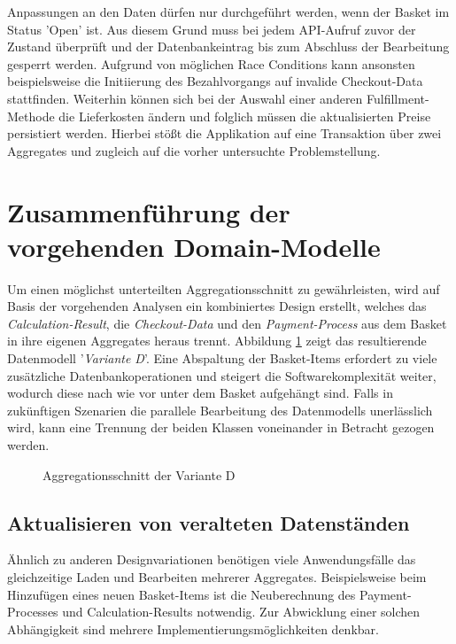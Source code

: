 Anpassungen an den Daten dürfen nur durchgeführt werden, wenn der Basket im Status 'Open' ist. Aus diesem Grund muss bei jedem API-Aufruf zuvor der Zustand überprüft und der Datenbankeintrag bis zum Abschluss der Bearbeitung gesperrt werden. Aufgrund von möglichen Race Conditions kann ansonsten beispielsweise die Initiierung des Bezahlvorgangs auf invalide Checkout-Data stattfinden. Weiterhin können sich bei der Auswahl einer anderen Fulfillment-Methode die Lieferkosten ändern und folglich müssen die aktualisierten Preise persistiert werden. Hierbei stößt die Applikation auf eine Transaktion über zwei Aggregates und zugleich auf die vorher untersuchte Problemstellung.

\pagebreak

\section{Zusammenführung der vorgehenden Domain-Modelle}

Um einen möglichst unterteilten Aggregationsschnitt zu gewährleisten, wird auf Basis der vorgehenden Analysen ein kombiniertes Design erstellt, welches das \emph{Calculation-Result}, die \emph{Checkout-Data} und den \emph{Payment-Process} aus dem Basket in ihre eigenen Aggregates heraus trennt. Abbildung \ref{fig:VarD} zeigt das resultierende Datenmodell '\emph{Variante D}'. Eine Abspaltung der Basket-Items erfordert zu viele zusätzliche Datenbankoperationen und steigert die Softwarekomplexität weiter, wodurch diese nach wie vor unter dem Basket aufgehängt sind. Falls in zukünftigen Szenarien die parallele Bearbeitung des Datenmodells unerlässlich wird, kann eine Trennung der beiden Klassen voneinander in Betracht gezogen werden.  

\begin{figure}[htbp]
	\vspace{0.3cm}
	\centering
	
	\caption{Aggregationsschnitt der Variante D}
	\label{fig:VarD}
\end{figure}

\subsection{Aktualisieren von veralteten Datenständen}

Ähnlich zu anderen Designvariationen benötigen viele Anwendungsfälle das gleichzeitige Laden und Bearbeiten mehrerer Aggregates. Beispielsweise beim Hinzufügen eines neuen Basket-Items ist die Neuberechnung des Payment-Processes und Calculation-Results notwendig. Zur Abwicklung einer solchen Abhängigkeit sind mehrere Implementierungsmöglichkeiten denkbar. 

